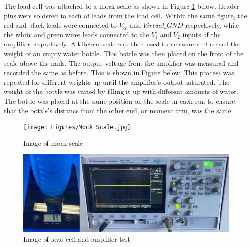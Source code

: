\documentclass[class=report,11pt,crop=false]{standalone}
\begin{document}
	The load cell was attached to a mock scale as shown in Figure \ref{fig:S9} below. Header pins were soldered to each of leads from the load cell. Within the same figure, the red and black leads were connected to $V_{cc}$ and $Virtual\_GND$ respectively, while the white and green wires leads connected to the $V_1$ and $V_2$ inputs of the amplifier respectively. A kitchen scale was then used to measure and record the weight of an empty water bottle. This bottle was then placed on the front of the scale above the nails. The output voltage from the amplifier was measured and recorded the same as before. This is shown in Figure below. This process was repeated for different weights up until the amplifier's output saturated. The weight of the bottle was varied by filling it up with different amounts of water. The bottle was placed at the same position on the scale in each run to ensure that the bottle's distance from the other end, or moment arm, was the same. 
	\begin{figure}[h!]
		\centering
		\texttt{[image: Figures/Mock Scale.jpg]}
		\caption{Image of mock scale}
		\label{fig:S9}
	\end{figure}
	
	\begin{figure}[h!]
		\centering
		\includegraphics[width=0.8\linewidth]{Figures/ATP3.jpg}
		\caption{Image of load cell and amplifier test}
		\label{fig:S10}
	\end{figure}
	
\end{document}

